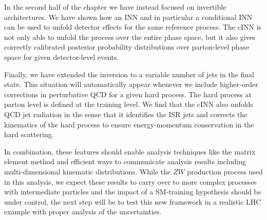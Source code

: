 In the second half of the chapter we have instead focused on invertible
architectures.
We have shown how an INN and in particular a
conditional INN can be used to unfold detector effects for the same
reference process. The cINN is not only able to unfold the process over the entire phase
space, but it also gives correctly calibrated posterior probability
distributions over parton-level phase space for given detector-level
events.

Finally, we have extended the inversion to a variable number of jets in
the final state. This situation will automatically appear whenever we
include higher-order corrections in perturbative QCD for a given hard
process. The hard process at parton level is defined at the training
level. We find that the cINN also unfolds QCD jet radiation in the
sense that it identifies the ISR jets and corrects the kinematics of
the hard process to ensure energy-momentum conservation in the hard
scattering.

In combination, these features should enable analysis techniques like
the matrix element method and efficient ways to communicate analysis
results including multi-dimensional kinematic distributions. While the
$ZW$ production process used in this analysis, we expect these results
to carry over to more complex processes with intermediate
particles and the impact of a SM-training
hypothesis should be under control, the next step will be
to test this new framework in a realistic LHC example with proper analysis of the
uncertainties.

%
%

